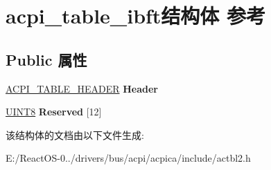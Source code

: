 \hypertarget{structacpi__table__ibft}{}\section{acpi\+\_\+table\+\_\+ibft结构体 参考}
\label{structacpi__table__ibft}
\subsection*{Public 属性}
\begin{DoxyCompactItemize}
\item 
\mbox{\label{structacpi__table__ibft_a068a23e81067ac2b39578468f9d1e1c5}} 
\hyperlink{structacpi__table__header}{A\+C\+P\+I\+\_\+\+T\+A\+B\+L\+E\+\_\+\+H\+E\+A\+D\+ER} {\bfseries Header}
\item 
\mbox{\label{structacpi__table__ibft_a8f3ca1afba15c5ebade48c8b8403bf56}} 
\hyperlink{_processor_bind_8h_ab27e9918b538ce9d8ca692479b375b6a}{U\+I\+N\+T8} {\bfseries Reserved} \mbox{[}12\mbox{]}
\end{DoxyCompactItemize}


该结构体的文档由以下文件生成\+:\begin{DoxyCompactItemize}
\item 
E\+:/\+React\+O\+S-\/0../drivers/bus/acpi/acpica/include/actbl2.\+h\end{DoxyCompactItemize}
